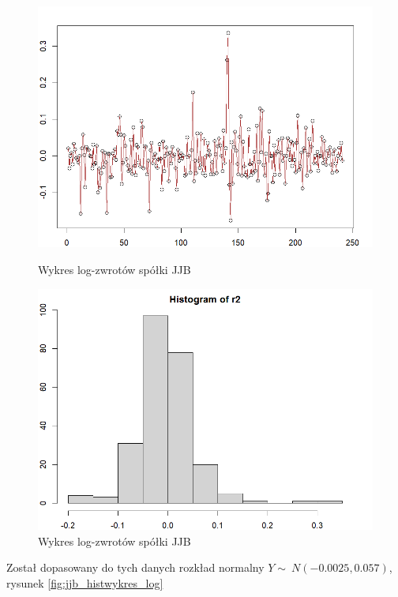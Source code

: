 \documentclass[a4paper,11pt]{article}
\begin{document}
\begin{figure}[!htb]
    \begin{minipage}{.45\textwidth}
        \centering
        \includegraphics[width=\linewidth]{jjb_wykres_log.png}
        \caption{Wykres log-zwrotów spółki JJB}
        \label{fig:jjb_wykres_log}
    \end{minipage}\hspace{0.1\textwidth}%
    \begin{minipage}{.45\textwidth}
        \centering
        \includegraphics[width=\linewidth]{jjb_hist_log.png}
        \caption{Wykres log-zwrotów spółki JJB}
        \label{fig:jjb_hist_log}
    \end{minipage}
\end{figure}

Został dopasowany do tych danych rozkład normalny $Y \sim\ N(-0.0025,0.057 )$, rysunek \ref{fig:jjb_histwykres_log}
\end{document}
